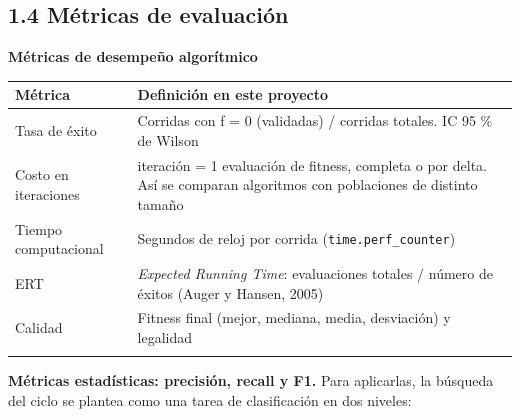 \documentclass[
  spanish,
  11pt,
]{article}
\newcounter{none} %
\begin{document}
\subsection{1.4 Métricas de
evaluación}\label{muxe9tricas-de-evaluaciuxf3n}

\textbf{Métricas de desempeño algorítmico}

{\def\LTcaptype{none} %
\begin{center}
\begin{tabular}{@{}
  >{\raggedright\arraybackslash}p{}
  >{\raggedright\arraybackslash}p{}@{}}
\toprule\noalign{}
\begin{minipage}[b]{\linewidth}\raggedright
Métrica
\end{minipage} & \begin{minipage}[b]{\linewidth}\raggedright
Definición en este proyecto
\end{minipage} \\
\midrule\noalign{}
Tasa de éxito & Corridas con f = 0 (validadas) / corridas totales. IC 95
\% de Wilson \\
Costo en iteraciones & 1 iteración = 1 evaluación de fitness, completa o
por delta. Así se comparan algoritmos con poblaciones de distinto
tamaño \\
Tiempo computacional & Segundos de reloj por corrida
(\texttt{time.perf\_counter}) \\
ERT & \emph{Expected Running Time}: evaluaciones totales / número de
éxitos (Auger y Hansen, 2005) \\
Calidad & Fitness final (mejor, mediana, media, desviación) y
legalidad \\
\bottomrule\noalign{}
\end{tabular}
\end{center}
}

\textbf{Métricas estadísticas: precisión, recall y F1.} Para aplicarlas,
la búsqueda del ciclo se plantea como una tarea de clasificación en dos
niveles:
\end{document}
